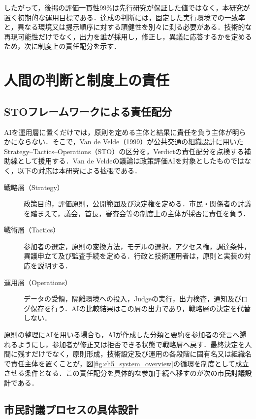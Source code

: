 したがって，後掲の評価一貫性99\%は先行研究が保証した値ではなく，本研究が置く初期的な運用目標である．達成の判断には，固定した実行環境での一致率と，異なる環境又は提示順序に対する頑健性を別々に測る必要がある．技術的な再現可能性だけでなく，出力を誰が採用し，修正し，異議に応答するかを定めるため，次に制度上の責任配分を示す．

\section{人間の判断と制度上の責任}
\label{subsec:ch6_human_support}

\subsection{STOフレームワークによる責任配分}
\label{sec:ch5_sto_framework}

AIを運用層に置くだけでは，原則を定める主体と結果に責任を負う主体が明らかにならない．そこで，Van de Velde（1999）が公共交通の組織設計に用いたStrategy--Tactics--Operations（STO）の区分を，Verdictの責任配分を点検する補助線として援用する\cite{vandevelde1999organisational}．Van de Veldeの議論は政策評価AIを対象としたものではなく，以下の対応は本研究による拡張である．

\begin{description}
\item[戦略層（Strategy）] 政策目的，評価原則，公開範囲及び決定権を定める．市民・関係者の討議を踏まえて，議会，首長，審査会等の制度上の主体が採否に責任を負う．
\item[戦術層（Tactics）] 参加者の選定，原則の変換方法，モデルの選択，アクセス権，調達条件，異議申立て及び監査手続を定める．行政と技術運用者は，原則と実装の対応を説明する．
\item[運用層（Operations）] データの受領，隔離環境への投入，Judgeの実行，出力検査，通知及びログ保存を行う．AIの比較結果はこの層の出力であり，戦略層の決定を代替しない．
\end{description}

原則の整理にAIを用いる場合も，AIが作成した分類と要約を参加者の発言へ遡れるようにし，参加者が修正又は拒否できる状態で戦略層へ戻す．最終決定を人間に残すだけでなく，原則形成，技術設定及び運用の各段階に固有名又は組織名で責任主体を置くことが，図\ref{fig:ch5_system_overview}の循環を制度として成立させる条件となる．この責任配分を具体的な参加手続へ移すのが次の市民討議設計である．

\subsection{市民討議プロセスの具体設計}
\label{sec:ch5_citizen_deliberation}

